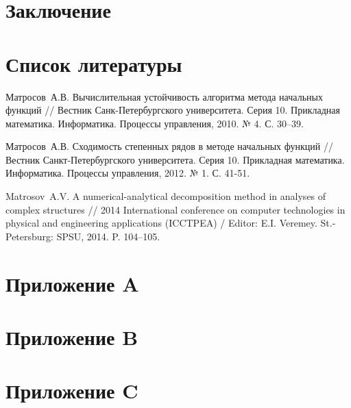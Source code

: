 \documentclass[a4paper]{report}
\begin{document}
	\chapter*{Заключение}
	\lipsum[74-78]
	
	\chapter*{Список литературы}
	\begin{thebibliography}{9}
		Матросов~А.\:В.
		Вычислительная устойчивость алгоритма метода начальных функций
		// Вестник Санк-Петербургского университета. Серия 10. Прикладная математика. Информатика. Процессы управления, 2010. № 4. С. 30--39.	
		
		Матросов~А.\:В.
		Сходимость степенных рядов в методе начальных функций
		// Вестник Санкт-Петербургского университета. Серия 10. Прикладная математика. Информатика. Процессы управления, 2012. № 1. С. 41-51.	
		
		Matrosov~A.\:V.
		A numerical-analytical decomposition method in analyses of complex structures
		// 2014 International conference on computer technologies in physical and engineering applications (ICCTPEA)
		/ Editor: E.\:I. Veremey. St.-Petersburg: SPSU, 2014. P. 104--105.
	\end{thebibliography}

	\chapter*{Приложение A}
	
	\chapter*{Приложение B}
	
	\chapter*{Приложение C}
\end{document}
